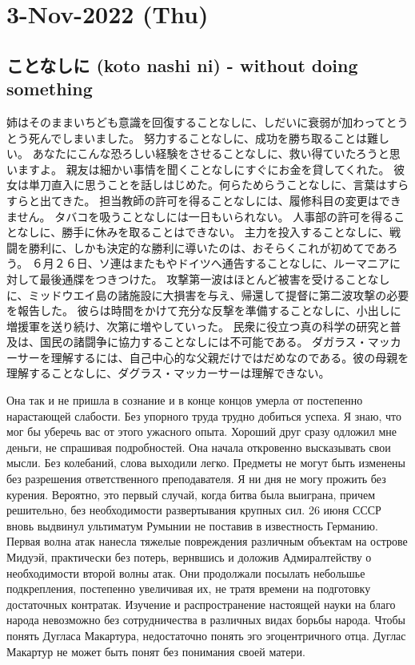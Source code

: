 \section{3-Nov-2022 (Thu)}
\subsection{ことなしに (koto nashi ni) - without doing something}

姉はそのままいちども意識を回復することなしに、しだいに衰弱が加わってとうとう死んでしまいました。
努力することなしに、成功を勝ち取ることは難しい。
あなたにこんな恐ろしい経験をさせることなしに、救い得ていたろうと思いますよ。
親友は細かい事情を聞くことなしにすぐにお金を貸してくれた。
彼女は単刀直入に思うことを話しはじめた。何らためらうことなしに、言葉はすらすらと出てきた。
担当教師の許可を得ることなしには、履修科目の変更はできません。
タバコを吸うことなしには一日もいられない。
人事部の許可を得ることなしに、勝手に休みを取ることはできない。
主力を投入することなしに、戦闘を勝利に、しかも決定的な勝利に導いたのは、おそらくこれが初めてであろう。
６月２６日、ソ連はまたもやドイツへ通告することなしに、ルーマニアに対して最後通牒をつきつけた。
攻撃第一波はほとんど被害を受けることなしに、ミッドウエイ島の諸施設に大損害を与え、帰還して提督に第二波攻撃の必要を報告した。
彼らは時間をかけて充分な反撃を準備することなしに、小出しに増援軍を送り続け、次第に増やしていった。
民衆に役立つ真の科学の研究と普及は、国民の諸闘争に協力することなしには不可能である。
ダガラス・マッカーサーを理解するには、自己中心的な父親だけではだめなのである。彼の母親を理解することなしに、ダグラス・マッカーサーは理解できない。

Она так и не пришла в сознание и в конце концов умерла от постепенно нарастающей слабости.
Без упорного труда трудно добиться успеха.
Я знаю, что мог бы уберечь вас от этого ужасного опыта.
Хороший друг сразу одложил мне деньги, не спрашивая подробностей.
Она начала откровенно высказывать свои мысли. Без колебаний, слова выходили легко.
Предметы не могут быть изменены без разрешения ответственного преподавателя. 
Я ни дня не могу прожить без курения.
Вероятно, это первый случай, когда битва была выиграна, причем решительно, без необходимости развертывания крупных сил.
26 июня СССР вновь выдвинул ультиматум Румынии не поставив в известность Германию.
Первая волна атак нанесла тяжелые повреждения различным объектам на острове Мидуэй, практически без потерь, вернвшись и доложив Адмиралтейству о необходимости второй волны атак.
Они продолжали посылать небольшье подкрепления, постепенно увеличивая их, не тратя времени на подготовку достаточных контратак.
Изучение и распространение настоящей науки на благо народа невозможно без сотрудничества в различных видах борьбы народа.
Чтобы понять Дугласа Макартура, недостаточно понять эго эгоцентричного отца. Дуглас Макартур не может быть понят без понимания своей матери.

